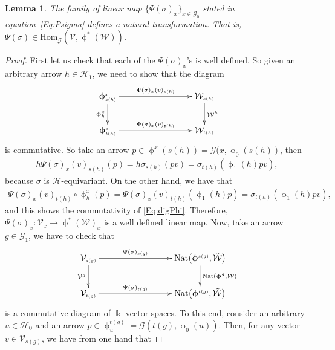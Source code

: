 \documentclass[pdftex]{sigma}
\numberwithin{equation}{section}
\newtheorem{Lemma}[Theorem]{Lemma}
\renewcommand{\hom}[3]{\mathrm{Hom}_{\Sscript{#1}}\left(#2, #3\right)}
\newcommand{\Go}{\cG_{\Sscript{0}}}
\newcommand{\Ga}{\cG_{\Sscript{1}}}
\newcommand{\Ho}{\cH_{\Sscript{0}}}
\newcommand{\Ha}{\cH_{\Sscript{1}}}
\newcommand{\Vx}{\cV_{\Sscript{x}}}
\newcommand{\cG}{{\mathcal G}}
\newcommand{\cH}{{\mathcal H}}
\newcommand{\cV}{{\mathcal V}}
\newcommand{\cW}{{\mathcal W}}
\newcommand{\phix}{\upphi^{\Sscript{x}}}
\newcommand{\Sscript}[1]{\scriptscriptstyle{#1}}
\newcommand{\phio}{\upphi_{\Sscript{0}}}
\newcommand{\phia}{\upphi_{\Sscript{1}}}
\begin{document}
\begin{Lemma}\label{lema:Psi}The family of linear map $\{\Psi(\sigma)_{\Sscript{x}}\}_{x \in \Go}$ stated in equation~\eqref{Eq:Psigma} defines a natural transformation. That is, $\Psi(\sigma) \in \hom{\cG}{\cV}{\upphi^*(\cW)}$.
\end{Lemma}
\begin{proof}First let us check that each of the $\Psi(\sigma)_{\Sscript{x}}$'s is well defined. So given an arbitrary arrow $h \in \Ha$, we need to show that the diagram
\begin{gather}\label{Eq:digPhi}
\begin{gathered}
\xymatrix@C=40pt{ \phix_{\Sscript{s(h)}} \ar@{->}^-{\Psi(\sigma)_{\Sscript{x}}(v)_{\Sscript{s(h)}}}[rr] \ar@{->}_-{\phix_{\Sscript{h}}}[d] & & \ar@{->}^-{\cW^{\Sscript{h}}}[d] \cW_{\Sscript{s(h)}} \\ \phix_{\Sscript{t(h)}} \ar@{->}^-{\Psi(\sigma)_{\Sscript{x}}(v)_{\Sscript{t(h)}}}[rr] & & \cW_{\Sscript{t(h)}} }
\end{gathered}
\end{gather}
is commutative. So take an arrow $p \in \phix(s(h))= \cG(x,\phio(s(h))$, then
\begin{gather*}
h \Psi(\sigma)_{\Sscript{x}}(v)_{\Sscript{s(h)}}(p) = h \sigma_{\Sscript{s(h)}} (p v) =\sigma_{\Sscript{t(h)}} (\phia(h) p v),
\end{gather*}
because $\sigma$ is $\cH$-equivariant. On the other hand, we have that
\begin{gather*}
\Psi(\sigma)_{\Sscript{x}}(v)_{\Sscript{t(h)}} \circ \phix_{\Sscript{h}}(p) = \Psi(\sigma)_{\Sscript{x}}(v)_{\Sscript{t(h)}}(\upphi_{\Sscript{1}}(h)p) = \sigma_{\Sscript{t(h)}}(\upphi_{\Sscript{1}}(h)pv),
\end{gather*}
and this shows the commutativity of \eqref{Eq:digPhi}. Therefore, $\Psi(\sigma)_{\Sscript{x}}\colon \Vx \to \upphi^*(\cW)_{\Sscript{x}}$ is a well defined linear map. Now, take an arrow $ g \in \Ga$, we have to check that
\begin{gather*}
\xymatrix@C=40pt{ \cV_{\Sscript{s(g)}} \ar@{->}^-{\Psi(\sigma)_{\Sscript{s(g)}}}[rr] \ar@{->}_-{\cV^{\Sscript{g}}}[d] & & \ar@{->}^-{{\rm
Nat} (\upphi^{\Sscript{g}}, \tilde{\cW} )}[d] {\rm Nat}\big(\upphi^{\Sscript{s(g)}}, \tilde{\cW}\big) \\ \cV_{\Sscript{t(g)}} \ar@{->}^-{\Psi(\sigma)_{\Sscript{t(g)}}}[rr] & & {\rm Nat}\big(\upphi^{\Sscript{t(g)}}, \tilde{\cW}\big) }
\end{gather*}
is a commutative diagram of $\Bbbk$-vector spaces. To this end, consider an arbitrary $u \in \Ho$ and an arrow $p \in \upphi^{\Sscript{t(g)}}_{\Sscript{u}}=\cG(t(g), \upphi_{\Sscript{0}}(u))$. Then, for any vector $v \in \cV_{\Sscript{s(g)}}$, we have from one hand that

\end{proof}
\end{document}
